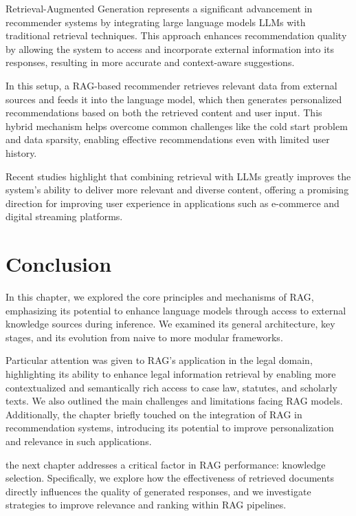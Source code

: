 Retrieval-Augmented Generation represents a significant advancement in recommender systems by integrating large language models LLMs with traditional retrieval techniques. This approach enhances recommendation quality by allowing the system to access and incorporate external information into its responses, resulting in more accurate and context-aware suggestions.

In this setup, a RAG-based recommender retrieves relevant data from external sources and feeds it into the language model, which then generates personalized recommendations based on both the retrieved content and user input\citep{DiPalma}. This hybrid mechanism helps overcome common challenges like the cold start problem and data sparsity, enabling effective recommendations even with limited user history.

Recent studies highlight that combining retrieval with LLMs greatly improves the system’s ability to deliver more relevant and diverse content, offering a promising direction for improving user experience in applications such as e-commerce and digital streaming platforms.



\section{Conclusion}


In this chapter, we explored the core principles and mechanisms of RAG, emphasizing its potential to enhance language models through access to external knowledge sources during inference. We examined its general architecture, key stages, and its evolution from naive to more modular frameworks. 

Particular attention was given to RAG’s application in the legal domain, highlighting its ability to enhance legal information retrieval by enabling more contextualized and semantically rich access to case law, statutes, and scholarly texts. We also outlined the main challenges and limitations facing RAG models. Additionally, the chapter briefly touched on the integration of RAG in recommendation systems, introducing its potential to improve personalization and relevance in such applications.

the next chapter addresses a critical factor in RAG performance: knowledge selection. Specifically, we explore how the effectiveness of retrieved documents directly influences the quality of generated responses, and we investigate strategies to improve relevance and ranking within RAG pipelines.
